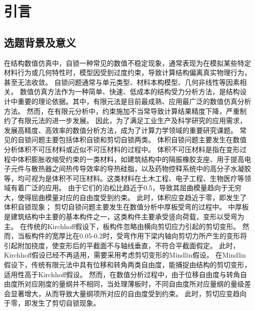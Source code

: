 \chapter{引言}
\section{选题背景及意义}
在结构数值仿真中，自锁一种常见的数值不稳定现象，通常表现为在模拟某些特定材料行为或几何特性时，模型因受到过度约束，导致计算结构偏离真实物理行为，甚至无法收敛。
自锁问题通常与单元类型、材料本构模型、几何非线性等因素相关。
数值仿真方法作为一种简单、快速、低成本的结构受力分析方法，是结构设计中重要的理论依据。其中，有限元法\cite{hughes2000}是目前最成熟、应用最广泛的数值仿真分析方法。
然而，在有限元分析中，约束施加不当常导致计算结果精度下降，严重制约了有限元法的进一步发展。
因此，为了满足工业生产及科学研究的应用需求，发展高精度、高效率的数值分析方法，成为了计算力学领域的重要研究课题。
常见的自锁问题主要包括体积自锁和剪切自锁两类。
体积自锁问题主要发生在数值分析体积不可压材料或近似不可压材料的过程中。
体积不可压材料是指在变形过程中体积膨胀收缩受约束的一类材料，如建筑结构中的隔振橡胶支座、用于提高电子元件与散热器之间热传导效率的导热硅脂，以及药物控释系统中的高分子水凝胶等，均可视为是体积不可压材料。这类材料在土木工程、电子工程、生物医疗等领域有着广泛的应用。
由于它们的泊松比趋近于0.5，导致其屈曲模量趋向于无穷大，使得屈曲模量对应的自由度受到约束。
此时，体积应变趋近于零，即发生了体积自锁现象；
剪切自锁问题主要发生在数值分析中厚板受弯的过程中。
中厚板是建筑结构中主要的基本构件之一，这类构件主要承受竖向荷载，变形以受弯为主。
在传统的Kirchhoff假设下，板构件忽略由横向剪切应力引起的剪切变形。
然而，当板构件的宽厚比在0.05-0.2时，受弯作用下梁内轴向剪切力所产生的变形将引起附加挠度，使变形后的平截面不与轴线垂直，不符合平截面假定。
此时，Kirchhoff假设已经不再适用，需要采用考虑剪切变形的Mindlin假设。
在Mindlin假设下，传统有限元法中具有位移和转角两类自由度，能捕捉由结构的剪切变形，适用性高于Kirchhoff假设。
然而，在数值分析过程中，由于位移自由度与转角自由度所对应刚度的量纲并不相同，当处理薄板时，不同自由度所对应量纲的量级差会显著增大，从而导致大量纲项所对应的自由度受到约束。
此时，剪切应变趋向于零，即发生了剪切自锁现象\cite{arnold1997}。

